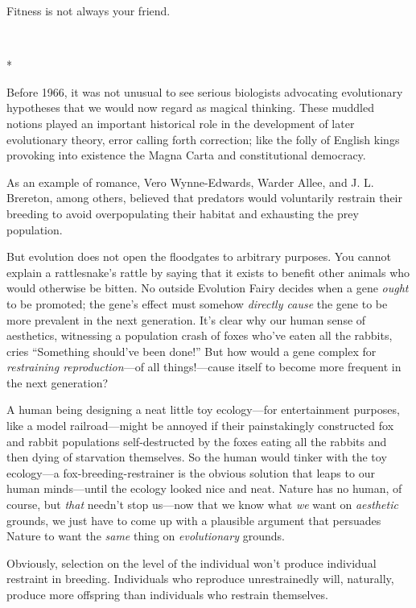 {
 Fitness is not always your friend.}

{\centering
 \ ~
\par}

{\centering
 *
\par}


{
 Before 1966, it was not unusual to see serious biologists
advocating evolutionary hypotheses that we would now regard as magical
thinking. These muddled notions played an important historical role in
the development of later evolutionary theory, error calling forth
correction; like the folly of English kings provoking into existence
the Magna Carta and constitutional democracy. }

{
 As an example of romance, Vero Wynne-Edwards, Warder Allee, and J.
L. Brereton, among others, believed that predators would voluntarily
restrain their breeding to avoid overpopulating their habitat and
exhausting the prey population.}

{
 But evolution does not open the floodgates to arbitrary purposes.
You cannot explain a rattlesnake's rattle by saying
that it exists to benefit other animals who would otherwise be bitten.
No outside Evolution Fairy decides when a gene \textit{ought} to be
promoted; the gene's effect must somehow
\textit{directly cause} the gene to be more prevalent in the next
generation. It's clear why our human sense of
aesthetics, witnessing a population crash of foxes
who've eaten all the rabbits, cries
``Something should've been
done!'' But how would a gene complex for
\textit{restraining reproduction}{}---of all things!---cause itself to
become more frequent in the next generation?}

{
 A human being designing a neat little toy ecology---for
entertainment purposes, like a model railroad---might be annoyed if
their painstakingly constructed fox and rabbit populations
self-destructed by the foxes eating all the rabbits and then dying of
starvation themselves. So the human would tinker with the toy
ecology---a fox-breeding-restrainer is the obvious solution that leaps
to our human minds---until the ecology looked nice and neat. Nature has
no human, of course, but \textit{that} needn't stop
us---now that we know what \textit{we} want on \textit{aesthetic}
grounds, we just have to come up with a plausible argument that
persuades Nature to want the \textit{same} thing on
\textit{evolutionary} grounds.}

{
 Obviously, selection on the level of the individual
won't produce individual restraint in breeding.
Individuals who reproduce unrestrainedly will, naturally, produce more
offspring than individuals who restrain themselves.}

